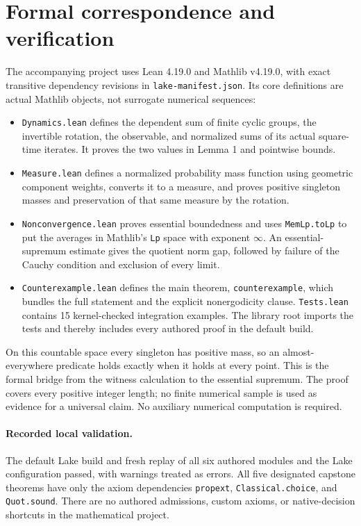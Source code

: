 \documentclass[11pt]{article}
\newcommand{\code}[1]{\texttt{\small #1}}
\begin{document}
\section{Formal correspondence and verification}
The accompanying project uses Lean 4.19.0 and Mathlib v4.19.0, with exact
transitive dependency revisions in \code{lake-manifest.json}. Its core definitions
are actual Mathlib objects, not surrogate numerical sequences:
\begin{itemize}[leftmargin=1.5em,itemsep=3pt]
\item \code{Dynamics.lean} defines the dependent sum of finite cyclic groups,
the invertible rotation, the observable, and normalized sums of its actual
square-time iterates. It proves the two values in Lemma 1 and pointwise bounds.
\item \code{Measure.lean} defines a normalized probability mass function using
geometric component weights, converts it to a measure, and proves positive
singleton masses and preservation of that same measure by the rotation.
\item \code{Nonconvergence.lean} proves essential boundedness and uses
\code{MemLp.toLp} to put the averages in Mathlib's \code{Lp} space with exponent
$\infty$. An essential-supremum estimate gives the quotient norm gap, followed by
failure of the Cauchy condition and exclusion of every limit.
\item \code{Counterexample.lean} defines the main theorem, \code{counterexample},
which bundles the full statement and the explicit nonergodicity clause.
\code{Tests.lean} contains 15 kernel-checked integration examples. The library
root imports the tests and thereby includes every authored proof in the default build.
\end{itemize}
On this countable space every singleton has positive mass, so an almost-everywhere
predicate holds exactly when it holds at every point. This is the formal bridge
from the witness calculation to the essential supremum. The proof covers every
positive integer length; no finite numerical sample is used as evidence for a
universal claim. No auxiliary numerical computation is required.

\paragraph{Recorded local validation.}
The default Lake build and fresh replay of all six authored modules and the Lake
configuration passed, with warnings treated as errors. All five designated
capstone theorems have only the axiom dependencies \code{propext},
\code{Classical.choice}, and \code{Quot.sound}. There are no authored admissions,
custom axioms, or native-decision shortcuts in the mathematical project.
\end{document}
